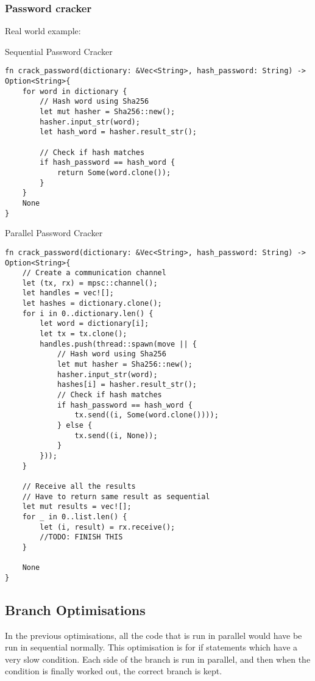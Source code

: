 \documentclass[conference]{IEEEtran}
\begin{document}
\subsubsection{Password cracker}
Real world example:
\begin{algorithm}
\caption{Sequential Password Cracker}
\label{code:seq-password}
\begin{verbatim}
fn crack_password(dictionary: &Vec<String>, hash_password: String) -> Option<String>{
    for word in dictionary {
        // Hash word using Sha256
        let mut hasher = Sha256::new();
        hasher.input_str(word);
        let hash_word = hasher.result_str();

        // Check if hash matches
        if hash_password == hash_word {
            return Some(word.clone());
        }
    }
    None
}
\end{verbatim}
\end{algorithm}

\begin{algorithm}
\caption{Parallel Password Cracker}
\label{code:par-password}
\begin{verbatim}
fn crack_password(dictionary: &Vec<String>, hash_password: String) -> Option<String>{
    // Create a communication channel
    let (tx, rx) = mpsc::channel();
    let handles = vec![];
    let hashes = dictionary.clone();
    for i in 0..dictionary.len() {
        let word = dictionary[i];
        let tx = tx.clone();
        handles.push(thread::spawn(move || {
            // Hash word using Sha256
            let mut hasher = Sha256::new();
            hasher.input_str(word);
            hashes[i] = hasher.result_str();
            // Check if hash matches
            if hash_password == hash_word {
                tx.send((i, Some(word.clone())));
            } else {
                tx.send((i, None));
            }
        }));
    }

    // Receive all the results
    // Have to return same result as sequential
    let mut results = vec![];
    for _ in 0..list.len() {
        let (i, result) = rx.receive();
        //TODO: FINISH THIS
    }

    None
}
\end{verbatim}
\end{algorithm}

\subsection{Branch Optimisations}
In the previous optimisations, all the code that is run in parallel would have be run in sequential normally. This optimisation is for if statements which have a very slow condition. Each side of the branch is run in parallel, and then when the condition is finally worked out, the correct branch is kept.
\end{document}
